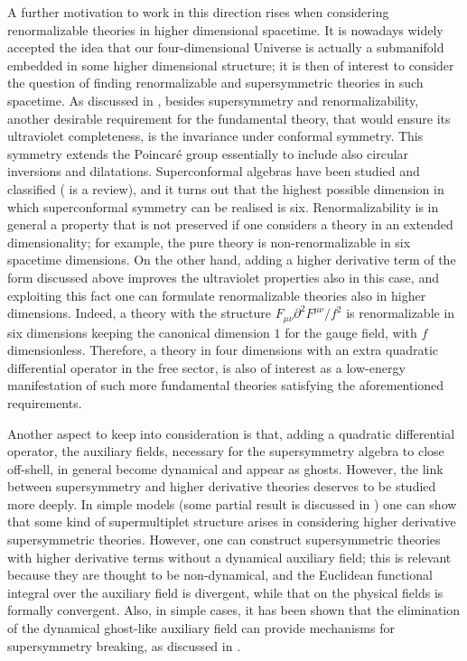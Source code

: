 A further motivation to work in this direction rises when considering renormalizable theories in higher dimensional spacetime.
It is nowadays widely accepted the idea that our four-dimensional Universe is actually a submanifold embedded in some higher dimensional structure;  it is then of interest to consider the question of finding renormalizable and supersymmetric theories in such spacetime. As discussed in \cite{Smilga:2005pr,Ivanov:2005qf}, besides supersymmetry and renormalizability, another desirable requirement for the fundamental theory, that would ensure its ultraviolet completeness, is the invariance under conformal symmetry. This symmetry extends the Poincar\'e group essentially to include also circular inversions and dilatations. Superconformal algebras have been studied and classified (\cite{VanProeyen:1999ni} is a review), and it turns out that the highest possible dimension in which superconformal symmetry can be realised is six.
Renormalizability is in general a property that is not preserved if one considers a theory in an extended dimensionality; for example, the pure \ym{} theory is non-renormalizable in six spacetime dimensions. On the other hand, adding a higher derivative term of the form discussed above improves the ultraviolet properties also in this case, and exploiting  this fact one can formulate renormalizable theories also in higher dimensions. Indeed, a theory with the structure $F_{\mu\nu} \partial^2 F^{\mu\nu}/f^2$ is renormalizable in six dimensions keeping the canonical dimension $1$ for the gauge field, with $f$ dimensionless.
Therefore, a theory in four dimensions with an extra quadratic differential operator in the free sector, is also of interest as a low-energy manifestation of such more fundamental theories satisfying the aforementioned requirements.



Another aspect to keep into consideration is that, adding a quadratic differential operator, the auxiliary fields, necessary for the supersymmetry algebra to close off-shell, in general become dynamical and appear as ghosts.
However, the link between supersymmetry and higher derivative theories deserves to be studied more deeply. In simple models (some partial result is discussed in \cite{Ferrara:1977mv}) one can show that some kind of supermultiplet structure arises in considering higher derivative supersymmetric theories. However, one can construct supersymmetric theories with higher derivative terms without a dynamical auxiliary field; this is relevant because they are thought to be non-dynamical, and the Euclidean functional integral over the auxiliary field is divergent, while that on the physical fields is formally convergent. Also, in simple cases, it has been shown that the elimination of the dynamical ghost-like auxiliary field can provide mechanisms for supersymmetry breaking, as discussed in \cite{Fujimori:2016udq,Fujimori:2017kyi}.









